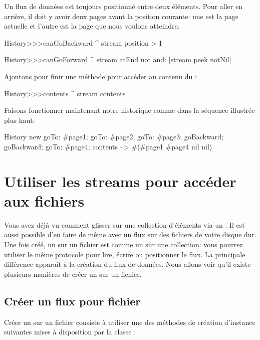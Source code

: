 \documentclass[a4paper,10pt,twoside]{book}
\begin{document}
Un flux de données est toujours positionné entre deux éléments.
Pour aller en arrière, il doit y avoir deux pages avant la position courante:
une est la page actuelle et l'autre est la page que nous voulons atteindre.

\begin{code}{}
History>>>canGoBackward
  ^ stream position > 1

History>>>canGoForward
  ^ stream atEnd not and: [stream peek notNil]
\end{code}

Ajoutons pour finir une méthode pour accéder au contenu du \stream:
\begin{code}{}
History>>>contents
  ^ stream contents
\end{code}

Faisons fonctionner maintenant notre historique 
comme dans la séquence illustrée plus haut:
\begin{code}{}
History new
	goTo: #page1;
	goTo: #page2;
	goTo: #page3;
	goBackward;
	goBackward;
	goTo: #page4;
	contents --> #(#page1 #page4 nil nil)
\end{code}

\section{Utiliser les streams pour accéder aux fichiers}

Vous avez déjà vu comment glisser sur une collection d'éléments via
un \stream. Il est aussi possible d'en faire de même avec un flux 
sur des fichiers de votre disque dur.
Une fois créé, un \stream sur un fichier est comme un \stream sur
une collection: vous pourrez utiliser le même protocole pour lire, écrire
ou positionner le flux.
La principale différence apparaît à la création du flux de données.
Nous allons voir qu'il existe plusieurs manières de créer un \stream sur un fichier.

\subsection{Créer un flux pour fichier}

Créer un \stream sur un fichier consiste à utiliser une des méthodes
de création d'instance suivantes mises à disposition par la classe
:
\end{document}
